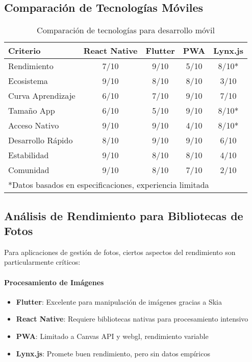 \subsection{Comparación de Tecnologías Móviles}

\begin{table}[H]
\centering
\begin{tabular}{|l|c|c|c|c|}
\hline
\textbf{Criterio} & \textbf{React Native} & \textbf{Flutter} & \textbf{PWA} & \textbf{Lynx.js} \\
\hline
Rendimiento & 7/10 & 9/10 & 5/10 & 8/10* \\
Ecosistema & 9/10 & 8/10 & 8/10 & 3/10 \\
Curva Aprendizaje & 6/10 & 7/10 & 9/10 & 7/10 \\
Tamaño App & 6/10 & 5/10 & 9/10 & 8/10* \\
Acceso Nativo & 9/10 & 9/10 & 4/10 & 8/10* \\
Desarrollo Rápido & 8/10 & 9/10 & 9/10 & 6/10 \\
Estabilidad & 9/10 & 8/10 & 8/10 & 4/10 \\
Comunidad & 9/10 & 8/10 & 7/10 & 2/10 \\
\hline
\multicolumn{5}{|l|}{*Datos basados en especificaciones, experiencia limitada} \\
\hline
\end{tabular}
\caption{Comparación de tecnologías para desarrollo móvil}
\label{tab:mobile_tech_comparison}
\end{table}

\subsection{Análisis de Rendimiento para Bibliotecas de Fotos}

Para aplicaciones de gestión de fotos, ciertos aspectos del rendimiento son particularmente críticos:

\paragraph{Procesamiento de Imágenes}
\begin{itemize}
    \item \textbf{Flutter}: Excelente para manipulación de imágenes gracias a Skia
    \item \textbf{React Native}: Requiere bibliotecas nativas para procesamiento intensivo
    \item \textbf{PWA}: Limitado a Canvas API y \gls{webgl}, rendimiento variable
    \item \textbf{Lynx.js}: Promete buen rendimiento, pero sin datos empíricos
\end{itemize}

